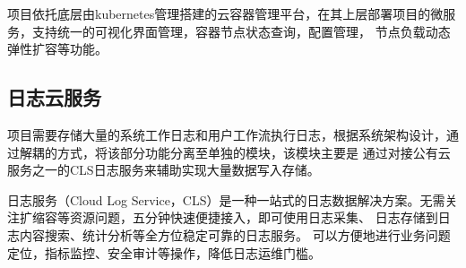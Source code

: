 项目依托底层由kubernetes管理搭建的云容器管理平台，在其上层部署项目的微服务，支持统一的可视化界面管理，容器节点状态查询，配置管理，
节点负载动态弹性扩容等功能。

\subsection{日志云服务}
项目需要存储大量的系统工作日志和用户工作流执行日志，根据系统架构设计，通过解耦的方式，将该部分功能分离至单独的模块，该模块主要是
通过对接公有云服务之一的CLS日志服务来辅助实现大量数据写入存储。

日志服务（Cloud Log Service，CLS）是一种一站式的日志数据解决方案。无需关注扩缩容等资源问题，五分钟快速便捷接入，即可使用日志采集、
日志存储到日志内容搜索、统计分析等全方位稳定可靠的日志服务。 可以方便地进行业务问题定位，指标监控、安全审计等操作，降低日志运维门槛。

%
%
%
%


%


